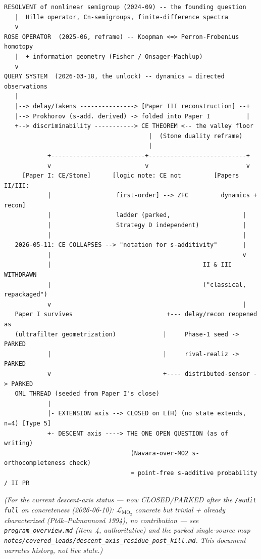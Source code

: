 \documentclass[11pt]{article}
\begin{document}
\begin{Verbatim}[fontsize=\small,frame=single,framesep=6pt]
RESOLVENT of nonlinear semigroup (2024-09) -- the founding question
   |  Hille operator, Cn-semigroups, finite-difference spectra
   v
ROSE OPERATOR  (2025-06, reframe) -- Koopman <=> Perron-Frobenius homotopy
   |  + information geometry (Fisher / Onsager-Machlup)
   v
QUERY SYSTEM  (2026-03-18, the unlock) -- dynamics = directed observations
   |
   |--> delay/Takens ---------------> [Paper III reconstruction] --+
   |--> Prokhorov (s-add. derived) -> folded into Paper I          |
   +--> discriminability -----------> CE THEOREM <-- the valley floor
                                        |  (Stone duality reframe)
                                        |
            +--------------------------+---------------------------+
            v                          v                           v
     [Paper I: CE/Stone]      [logic note: CE not         [Papers II/III:
            |                  first-order] --> ZFC         dynamics + recon]
            |                  ladder (parked,                    |
            |                  Strategy D independent)            |
            |                                                     |
   2026-05-11: CE COLLAPSES --> "notation for s-additivity"       |
            |                                                     v
            |                                          II & III WITHDRAWN
            |                                          ("classical, repackaged")
            v                                                     |
   Paper I survives                          +--- delay/recon reopened as
   (ultrafilter geometrization)             |     Phase-1 seed -> PARKED
            |                               |     rival-realiz -> PARKED
            v                               +---- distributed-sensor -> PARKED
   OML THREAD (seeded from Paper I's close)
            |
            |- EXTENSION axis --> CLOSED on L(H) (no state extends, n=4) [Type 5]
            +- DESCENT axis ----> THE ONE OPEN QUESTION (as of writing)
                                   (Navara-over-MO2 s-orthocompleteness check)
                                   = point-free s-additive probability / II PR
\end{Verbatim}

\noindent\emph{(For the current descent-axis status --- now CLOSED/PARKED after
the \texttt{/audit full} on concreteness (2026-06-10): $\mathcal
L_{\mathrm{MO}_2}$ concrete but trivial + already characterized
(Pt\'ak--Pulmannov\'a 1994), no contribution --- see \texttt{program\_overview.md}
(item~4, authoritative) and the parked single-source map
\texttt{notes/covered\_leads/descent\_axis\_residue\_post\_kill.md}. This document
narrates history, not live state.)}
\end{document}
